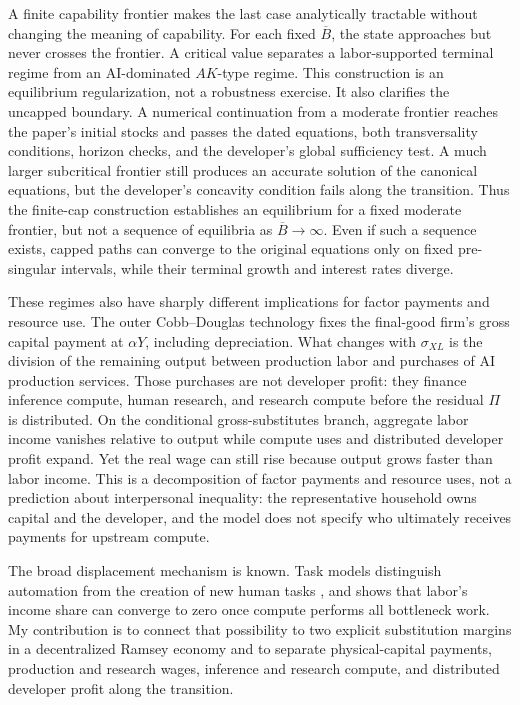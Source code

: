 A finite capability frontier makes the last case analytically tractable without
changing the meaning of capability. For each fixed \(\overline B\), the state
approaches but never crosses the frontier. A critical value separates a
labor-supported terminal regime from an AI-dominated \(AK\)-type regime. This
construction is an equilibrium regularization, not a robustness exercise. It
also clarifies the uncapped boundary. A numerical continuation from a moderate
frontier reaches the paper's initial stocks and passes the dated equations,
both transversality conditions, horizon checks, and the developer's global
sufficiency test. A much larger subcritical frontier still produces an accurate
solution of the canonical equations, but the developer's concavity condition
fails along the transition. Thus the finite-cap construction establishes an
equilibrium for a fixed moderate frontier, but not a sequence of equilibria as
\(\overline B\to\infty\). Even if such a sequence exists, capped paths can
converge to the original equations only on fixed pre-singular intervals, while
their terminal growth and interest rates diverge.

These regimes also have sharply different implications for factor payments and
resource use. The outer Cobb--Douglas technology fixes the final-good firm's
gross capital payment
at \(\alpha Y\), including depreciation. What changes with \(\sigma_{XL}\) is
the division of the remaining output between production labor and purchases of
AI production services. Those purchases are not developer profit: they finance inference
compute, human research, and research compute before the residual \(\Pi\) is
distributed. On the conditional gross-substitutes branch, aggregate labor
income vanishes relative to output while compute uses and distributed developer
profit expand. Yet the real wage can still rise because output grows faster
than labor income. This is a decomposition of factor payments and resource
uses, not a prediction about interpersonal inequality: the representative
household owns capital and the developer, and the model does not specify who
ultimately receives payments for upstream compute.

The broad displacement mechanism is known. Task models distinguish automation
from the creation of new human tasks \citep{acemoglurestrepo2019}, and
\citet{restrepo2025agi} shows that labor's income share can converge to zero once
compute performs all bottleneck work. My contribution is to connect that
possibility to two explicit substitution margins in a decentralized Ramsey
economy and to separate physical-capital payments, production and research
wages, inference and research compute, and distributed developer profit along
the transition.

